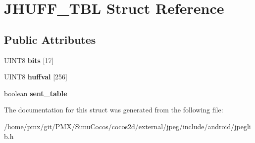 \hypertarget{structJHUFF__TBL}{}\section{J\+H\+U\+F\+F\+\_\+\+T\+BL Struct Reference}
\label{structJHUFF__TBL}
\subsection*{Public Attributes}
\begin{DoxyCompactItemize}
\item 
\mbox{\label{structJHUFF__TBL_a40e3f7adc5ead202a5ad1c46897ae97f}} 
U\+I\+N\+T8 {\bfseries bits} \mbox{[}17\mbox{]}
\item 
\mbox{\label{structJHUFF__TBL_aef0eb814cdccd9aaa61fc73273558a05}} 
U\+I\+N\+T8 {\bfseries huffval} \mbox{[}256\mbox{]}
\item 
\mbox{\label{structJHUFF__TBL_a387c655e83d0d57c50802856d630f37b}} 
boolean {\bfseries sent\+\_\+table}
\end{DoxyCompactItemize}


The documentation for this struct was generated from the following file\+:\begin{DoxyCompactItemize}
\item 
/home/pmx/git/\+P\+M\+X/\+Simu\+Cocos/cocos2d/external/jpeg/include/android/jpeglib.\+h\end{DoxyCompactItemize}

